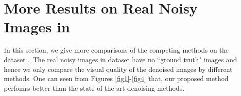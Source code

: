 \documentclass[10pt,onecolumn,letterpaper]{article}
\begin{document}

\section{More Results on Real Noisy Images in \cite{ncwebsite}}
In this section, we give more comparisons of the competing methods on the dataset \cite{ncwebsite}.\ The real noisy images in dataset \cite{ncwebsite} have no ``ground truth" images and hence we only compare the visual quality of the denoised images by different methods. One can seen from Figures \ref{fig1}-\ref{fig4} that, our proposed method perfomrs better than the state-of-the-art denoising methods.
\end{document}
